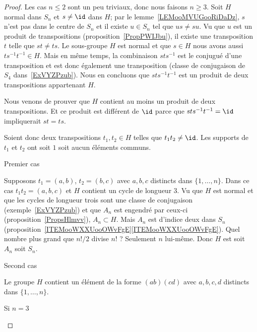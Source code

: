 \begin{proof}
    Les cas \( n\leq 2\) sont un peu triviaux, donc nous faisons \( n\geq 3\). Soit \( H\) normal dans \( S_n\) et \( s\neq \id\) dans \( H\); par le lemme~\ref{LEMooMVUGooRiDaDz}, \( s\) n'est pas dans le centre de \( S_n\) et il existe \( u\in S_n\) tel que \( us\neq su\). Vu que \( u\) est un produit de transpositions (proposition~\ref{PropPWIJbu}), il existe une transposition \( t\) telle que \( st\neq ts\). Le sous-groupe \( H\) est normal et que \( s\in H\) nous avons aussi \( ts^{-1}t^{-1}\in H\). Mais en même temps, la combinaison \( sts^{-1}\) est le conjugué d'une transposition et est donc également une transposition (classe de conjugaison de \( S_4\) dans~\ref{ExVYZPzub}). Nous en concluons que \( sts^{-1}t^{-1}\) est un produit de deux transpositions appartenant \( H\).

    Nous venons de prouver que \( H\) contient au moins un produit de deux transpositions. Et ce produit est différent de \( \id\) parce que \( sts^{-1}t^{-1}=\id\) impliquerait \( st=ts\).

    Soient donc deux transpositions \( t_1,t_2\in H\) telles que \( t_1t_2\neq \id\). Les supports de \( t_1\) et \( t_2\) ont soit \( 1\) soit aucun éléments communs.

    \begin{subproof}
        \item[Premier cas]

            Supposons \( t_1=(a,b)\), \( t_2=(b,c)\) avec \( a,b,c\) distincts dans \( \{ 1,\ldots, n \}\). Dans ce cas \( t_1t_2=(a,b,c)\) et \( H\) contient un cycle de longueur \( 3\). Vu que \( H\) est normal et que les cycles de longueur trois sont une classe de conjugaison (exemple~\ref{ExVYZPzub}) et que \( A_n\) est engendré par ceux-ci (proposition~\ref{PropsHlmvv}), \( A_n\subset H\). Mais \( A_n\) est d'indice deux dans \( S_n\) (proposition~\ref{ITEMooWXXUooOWvFgE}\ref{ITEMooWXXUooOWvFgE}). Quel nombre plus grand que \( n!/2\) divise \( n!\) ? Seulement \( n\) lui-même. Donc \( H\) est soit \( A_n\) soit \( S_n\).

        \item[Second cas]

            Le groupe \( H\) contient un élément de la forme \( (ab)(cd)\) avec \( a,b,c,d\) distincts dans \( \{ 1,\ldots, n \}\).

            \begin{subproof}

                \item[Si \( n=3\)]


\end{subproof}
\end{subproof}
\end{proof}
